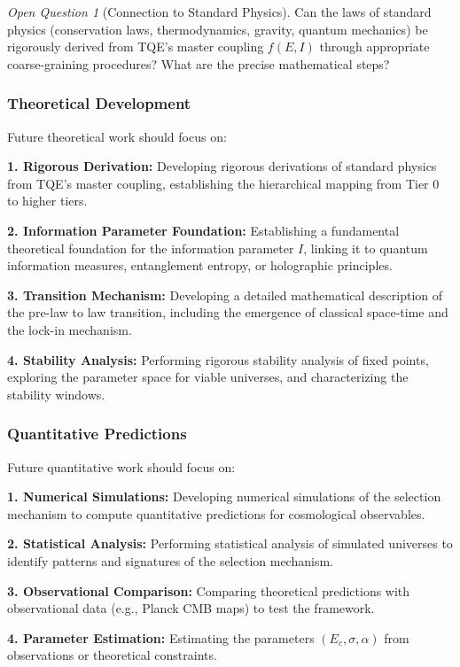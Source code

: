 \documentclass[12pt,a4paper]{article}
\theoremstyle{definition}
\theoremstyle{remark}
\newtheorem{question}{Open Question}[section]
\begin{document}
\begin{question}[Connection to Standard Physics]
Can the laws of standard physics (conservation laws, thermodynamics, gravity, quantum mechanics) be rigorously derived from TQE's master coupling $f(E,I)$ through appropriate coarse-graining procedures? What are the precise mathematical steps?
\end{question}

\subsubsection{Theoretical Development}

Future theoretical work should focus on:

\textbf{1. Rigorous Derivation:} Developing rigorous derivations of standard physics from TQE's master coupling, establishing the hierarchical mapping from Tier 0 to higher tiers.

\textbf{2. Information Parameter Foundation:} Establishing a fundamental theoretical foundation for the information parameter $I$, linking it to quantum information measures, entanglement entropy, or holographic principles.

\textbf{3. Transition Mechanism:} Developing a detailed mathematical description of the pre-law to law transition, including the emergence of classical space-time and the lock-in mechanism.

\textbf{4. Stability Analysis:} Performing rigorous stability analysis of fixed points, exploring the parameter space for viable universes, and characterizing the stability windows.

\subsubsection{Quantitative Predictions}

Future quantitative work should focus on:

\textbf{1. Numerical Simulations:} Developing numerical simulations of the selection mechanism to compute quantitative predictions for cosmological observables.

\textbf{2. Statistical Analysis:} Performing statistical analysis of simulated universes to identify patterns and signatures of the selection mechanism.

\textbf{3. Observational Comparison:} Comparing theoretical predictions with observational data (e.g., Planck CMB maps) to test the framework.

\textbf{4. Parameter Estimation:} Estimating the parameters $(E_c, \sigma, \alpha)$ from observations or theoretical constraints.
\end{document}
